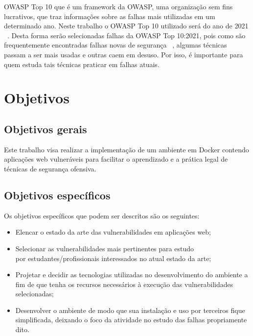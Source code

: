 OWASP Top 10 que é um framework da OWASP, uma organização sem fins lucrativos, que traz informações sobre as falhas mais utilizadas em um determinado ano. Neste trabalho o OWASP Top 10 utilizado será do ano de 2021 ~\cite{url:OWASP}. Desta forma serão selecionadas falhas da OWASP Top 10:2021, pois como são frequentemente encontradas falhas novas de segurança  ~\cite{https://doi.org/10.48550/arxiv.2205.02544}, algumas técnicas passam a ser mais usadas e outras caem em desuso. Por isso, é importante para quem estuda tais técnicas praticar em falhas atuais.

\section{Objetivos}

\subsection{Objetivos gerais }

Este trabalho visa realizar a implementação de um ambiente em Docker contendo aplicações web vulneráveis para facilitar o aprendizado e a prática legal de técnicas de segurança ofensiva.

\subsection{Objetivos específicos}
Os objetivos específicos que podem ser descritos são os seguintes:

\begin{itemize}

\item Elencar o estado da arte das vulnerabilidades em aplicações web;
\item Selecionar as vulnerabilidades mais pertinentes para estudo\\por estudantes/profissionais interessados no atual estado da arte;
\item Projetar e decidir as tecnologias utilizadas no desenvolvimento do ambiente a fim de que tenha os recursos necessários à execução das vulnerabilidades selecionadas;
\item Desenvolver o ambiente de modo que sua instalação e uso por terceiros fique simplificada, deixando o foco da atividade no estudo das falhas propriamente dito.

\end{itemize}

